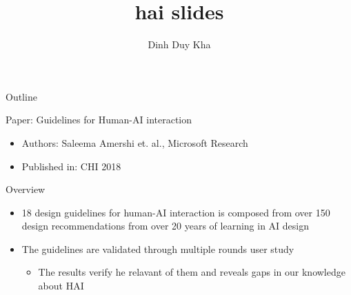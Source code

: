 \documentclass[presentation]{beamer}
\author{Dinh Duy Kha}
\date{}
\title{hai slides}
\begin{document}
\maketitle
\begin{frame}{Outline}
\tableofcontents
\end{frame}



\begin{frame}[label={sec:org55ed178}]{Paper: Guidelines for Human-AI interaction}
\begin{itemize}
\item Authors: Saleema Amershi et. al., Microsoft Research
\item Published in: CHI 2018
\end{itemize}
\begin{block}{Overview}
\begin{itemize}
\item 18 design guidelines for human-AI interaction is composed from over 150 design recommendations from over 20 years of learning in AI design
\item The guidelines are validated through multiple rounds user study
\begin{itemize}
\item The results verify he relavant of them and reveals gaps in our knowledge about HAI
\end{itemize}
\end{itemize}
\end{block}
\end{frame}
\end{document}
